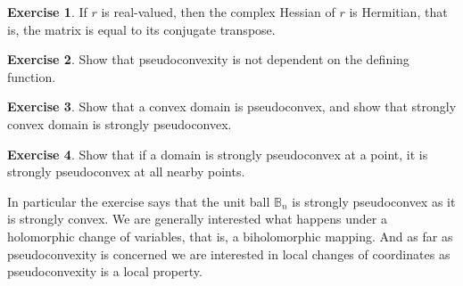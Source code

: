 \documentclass[12pt,openany]{book}
\newcommand{\bB}{{\mathbb{B}}}
\theoremstyle{plain}
\theoremstyle{remark}
\theoremstyle{definition}
\newenvironment{exbox}{%
    \def\FrameCommand{\vrule width 1pt \relax\hspace {10pt}}%
    \MakeFramed {\advance \hsize -\width \FrameRestore }%
}{%
    \endMakeFramed
}
\theoremstyle{exercise}
\newtheorem{exercise}{Exercise}[section]
\theoremstyle{example}
\begin{document}
\begin{exbox}
\begin{exercise}
If $r$ is real-valued, then the complex Hessian of $r$ is Hermitian, that
is, the matrix is equal to its conjugate transpose.
\end{exercise}

\begin{exercise}
Show that pseudoconvexity is not dependent on the defining function.
\end{exercise}

\begin{exercise}
Show that a convex domain is pseudoconvex, and show that strongly convex
domain is strongly pseudoconvex.
\end{exercise}

\begin{exercise}
Show that if a domain is strongly pseudoconvex at a point, it is strongly
pseudoconvex at all nearby points.
\end{exercise}
\end{exbox}

In particular the exercise says that the unit ball $\bB_n$ is
strongly pseudoconvex as it is strongly convex.
We are generally interested what happens under a holomorphic change of
variables, that is, a biholomorphic mapping.  And as far as pseudoconvexity
is concerned we are interested in local changes of coordinates as
pseudoconvexity is a local property.
\end{document}
